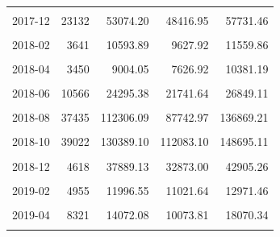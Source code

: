 \begin{longtable}[t]{crrrr}
\cellcolor{gray!10}{2017-11} & \cellcolor{gray!10}{31821} & \cellcolor{gray!10}{88181.65} & \cellcolor{gray!10}{80795.09} & \cellcolor{gray!10}{95568.22}\\
2017-12 & 23132 & 53074.20 & 48416.95 & 57731.46\\
\cellcolor{gray!10}{2018-01} & \cellcolor{gray!10}{3627} & \cellcolor{gray!10}{15467.28} & \cellcolor{gray!10}{12938.51} & \cellcolor{gray!10}{17996.05}\\
2018-02 & 3641 & 10593.89 & 9627.92 & 11559.86\\
\cellcolor{gray!10}{2018-03} & \cellcolor{gray!10}{5152} & \cellcolor{gray!10}{10815.96} & \cellcolor{gray!10}{9534.84} & \cellcolor{gray!10}{12097.08}\\
2018-04 & 3450 & 9004.05 & 7626.92 & 10381.19\\
\cellcolor{gray!10}{2018-05} & \cellcolor{gray!10}{5960} & \cellcolor{gray!10}{13791.21} & \cellcolor{gray!10}{12229.92} & \cellcolor{gray!10}{15352.49}\\
2018-06 & 10566 & 24295.38 & 21741.64 & 26849.11\\
\cellcolor{gray!10}{2018-07} & \cellcolor{gray!10}{20243} & \cellcolor{gray!10}{51467.52} & \cellcolor{gray!10}{47808.85} & \cellcolor{gray!10}{55126.19}\\
2018-08 & 37435 & 112306.09 & 87742.97 & 136869.21\\
\cellcolor{gray!10}{2018-09} & \cellcolor{gray!10}{73180} & \cellcolor{gray!10}{210243.25} & \cellcolor{gray!10}{183157.29} & \cellcolor{gray!10}{237329.20}\\
2018-10 & 39022 & 130389.10 & 112083.10 & 148695.11\\
\cellcolor{gray!10}{2018-11} & \cellcolor{gray!10}{18423} & \cellcolor{gray!10}{72776.27} & \cellcolor{gray!10}{63848.07} & \cellcolor{gray!10}{81704.48}\\
2018-12 & 4618 & 37889.13 & 32873.00 & 42905.26\\
\cellcolor{gray!10}{2019-01} & \cellcolor{gray!10}{4129} & \cellcolor{gray!10}{15981.43} & \cellcolor{gray!10}{13535.63} & \cellcolor{gray!10}{18427.24}\\
2019-02 & 4955 & 11996.55 & 11021.64 & 12971.46\\
\cellcolor{gray!10}{2019-03} & \cellcolor{gray!10}{21414} & \cellcolor{gray!10}{21571.73} & \cellcolor{gray!10}{18093.83} & \cellcolor{gray!10}{25049.63}\\
2019-04 & 8321 & 14072.08 & 10073.81 & 18070.34\\
\cellcolor{gray!10}{2019-05} & \cellcolor{gray!10}{5228} & \cellcolor{gray!10}{12643.68} & \cellcolor{gray!10}{10881.38} & \cellcolor{gray!10}{14405.97}\\

\end{longtable}
